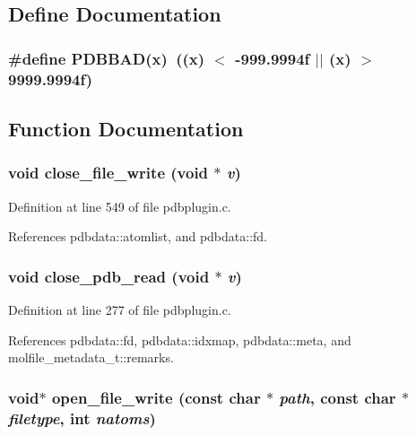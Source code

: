 \subsection{Define Documentation}
\subsubsection{\setlength{\rightskip}{0pt plus 5cm}\#define PDBBAD(x)\ ((x) $<$ -999.9994f $|$$|$ (x) $>$ 9999.9994f)}\label{pdbplugin_8c_a0}




\subsection{Function Documentation}
\subsubsection{\setlength{\rightskip}{0pt plus 5cm}void close\_\-file\_\-write (void $\ast$ {\em v})\hspace{0.3cm}{\tt  [static]}}\label{pdbplugin_8c_a11}




Definition at line 549 of file pdbplugin.c.

References pdbdata::atomlist, and pdbdata::fd.
\subsubsection{\setlength{\rightskip}{0pt plus 5cm}void close\_\-pdb\_\-read (void $\ast$ {\em v})\hspace{0.3cm}{\tt  [static]}}\label{pdbplugin_8c_a6}




Definition at line 277 of file pdbplugin.c.

References pdbdata::fd, pdbdata::idxmap, pdbdata::meta, and molfile\_\-metadata\_\-t::remarks.
\subsubsection{\setlength{\rightskip}{0pt plus 5cm}void$\ast$ open\_\-file\_\-write (const char $\ast$ {\em path}, const char $\ast$ {\em filetype}, int {\em natoms})\hspace{0.3cm}{\tt  [static]}}\label{pdbplugin_8c_a7}




